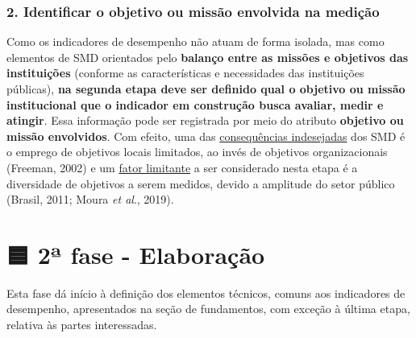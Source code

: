 \documentclass[
  letterpaper,
  DIV=11,
  numbers=noendperiod]{scrreprt}
\begin{document}
\hypertarget{identificar-o-objetivo-ou-missuxe3o-envolvida-na-mediuxe7uxe3o}{%
\subsection*{2. Identificar o objetivo ou missão envolvida na
medição}\label{identificar-o-objetivo-ou-missuxe3o-envolvida-na-mediuxe7uxe3o}}

Como os indicadores de desempenho não atuam de forma isolada, mas como
elementos de SMD orientados pelo \textbf{balanço entre as missões e
objetivos das instituições} (conforme as características e necessidades
das instituições públicas), \textbf{na segunda etapa deve ser definido
qual o objetivo ou missão institucional que o indicador em construção
busca avaliar, medir e atingir}. Essa informação pode ser registrada por
meio do atributo \textbf{objetivo ou missão envolvidos}. Com efeito, uma
das
\href{/o/AZWDclIWFqqJuBEvyQWk/s/ws6bIBOPv2tLRHdwbB7y/~/changes/788/1.-apresentacao/1.4-consequencias-indesejadas-e-limitacoes-da-medicao-de-desempenho\#consequencias-indesejadas-dos-smd-no-setor-publico}{consequências
indesejadas} dos SMD é o emprego de objetivos locais limitados, ao invés
de objetivos organizacionais (Freeman, 2002) e um
\href{/o/AZWDclIWFqqJuBEvyQWk/s/ws6bIBOPv2tLRHdwbB7y/~/changes/788/1.-apresentacao/1.4-consequencias-indesejadas-e-limitacoes-da-medicao-de-desempenho\#fatores-limitantes-a-medicao-de-desempenho-no-setor-publico}{fator
limitante} a ser considerado nesta etapa é a diversidade de objetivos a
serem medidos, devido a amplitude do setor público (Brasil, 2011; Moura
\emph{et al}., 2019).

\hypertarget{uxaa-fase---elaborauxe7uxe3o}{%
\chapter*{🟦 2ª fase - Elaboração}\label{uxaa-fase---elaborauxe7uxe3o}}


{Esta fase dá início à definição dos elementos técnicos, comuns aos
indicadores de desempenho, apresentados na seção de fundamentos, com
exceção à última etapa, relativa às partes interessadas.}
\end{document}
